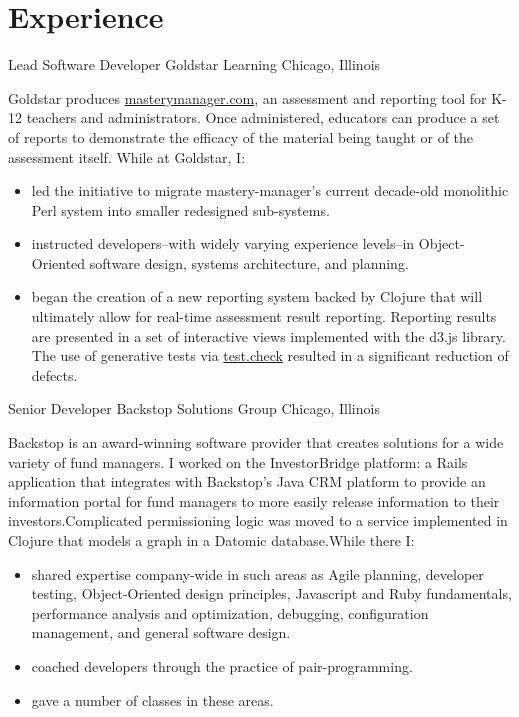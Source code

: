 \documentclass[11pt,letterpaper]{moderncv}
\begin{document}
\section{Experience}


 {Lead Software Developer} {Goldstar
  Learning} {Chicago, Illinois} {} { %
  Goldstar produces \href{https://www.masterymanager.com}{masterymanager.com},
  an assessment and reporting tool for K-12 teachers and administrators.  Once
  administered, educators can produce a set of reports to demonstrate the
  efficacy of the material being taught or of the assessment itself.  While at
  Goldstar, I:
  \begin{itemize}
  \item led the initiative to migrate mastery-manager's current decade-old
    monolithic Perl system into smaller redesigned sub-systems.
  \item instructed developers--with widely varying experience
    levels--in Object-Oriented software design, systems architecture,
    and planning.
  \item began the creation of a new reporting system backed by
    Clojure that will ultimately allow for real-time assessment
    result reporting.  Reporting results are presented in a set of
    interactive views implemented with the d3.js library.  The use of
    generative tests via
    \href{https://github.com/clojure/test.check}{test.check} resulted
    in a significant reduction of defects.
  \end{itemize}
}

 {Senior Developer} {Backstop Solutions Group} {Chicago, Illinois} {} {%
  Backstop is an award-winning software provider that creates solutions for a
  wide variety of fund managers.  I worked on the InvestorBridge platform: a
  Rails application that integrates with Backstop's Java CRM platform to
  provide an information portal for fund managers to more easily release
  information to their investors.\newline Complicated permissioning logic was moved
  to a service implemented in Clojure that models a graph in a Datomic
  database.\newline While there I:
  \begin{itemize}
  \item shared expertise company-wide in such areas as Agile planning,
    developer testing, Object-Oriented design principles, Javascript
    and Ruby fundamentals, performance analysis and optimization,
    debugging, configuration management, and general software design.
  \item coached developers through the practice of pair-programming.
  \item gave a number of classes in these areas.
  \end{itemize}
}
\end{document}
